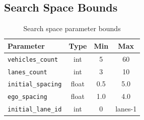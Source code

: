 \subsection{Search Space Bounds}

\begin{table}[H]
\centering
\begin{tabular}{|l|c|c|c|}
\hline
\textbf{Parameter} & \textbf{Type} & \textbf{Min} & \textbf{Max} \\
\hline
\texttt{vehicles\_count} & int & 5 & 60 \\
\texttt{lanes\_count} & int & 3 & 10 \\
\texttt{initial\_spacing} & float & 0.5 & 5.0 \\
\texttt{ego\_spacing} & float & 1.0 & 4.0 \\
\texttt{initial\_lane\_id} & int & 0 & lanes-1 \\
\hline
\end{tabular}
\caption{Search space parameter bounds}
\end{table}
